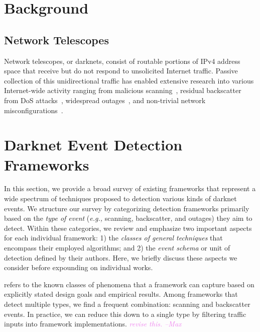\documentclass[manuscript,nonacm]{acmart}
\newcommand{\maxnote}[1]{\textit{\textcolor{violet}{#1 --Max}}}
\begin{document}
\section{Background}

\subsection{Network Telescopes}

Network telescopes, or darknets, consist of routable portions of IPv4 address space that receive but do not respond to unsolicited Internet traffic. 
Passive collection of this unidirectional traffic has enabled extensive research into various Internet-wide activity ranging from 
malicious scanning~\cite{@@}, residual backscatter from DoS attacks~\cite{@@}, widespread outages~\cite{@@}, and non-trivial network misconfigurations~\cite{@@}.


\section{Darknet Event Detection Frameworks}

In this section, we provide a broad survey of existing frameworks that represent a wide spectrum of techniques proposed to detection various kinds of darknet events.
We structure our survey by categorizing detection frameworks primarily based on the \textit{type of event} (\textit{e.g.,} scanning, backscatter, and outages) 
they aim to detect. Within these categories, we review and emphasize two important aspects for each individual framework: 1) the \textit{classes of general techniques} that encompass their employed algorithms; 
and 2) the \textit{event schema} or unit of detection defined by their authors. 
Here, we briefly discuss these aspects we consider before expounding on individual works.

\vspace{0.25em}
 refers to the known classes of phenomena that a framework can capture based on explicitly stated design goals and empirical results.
Among frameworks that detect multiple types, we find a frequent combination: scanning and backscatter events.
In practice, we can reduce this down to a single type by filtering traffic inputs into framework implementations.
\maxnote{revise this.}
\end{document}
